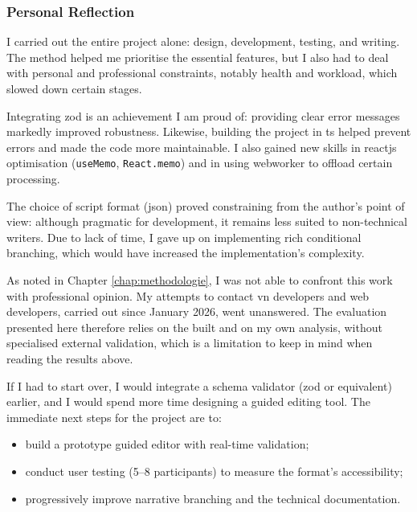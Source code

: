 \subsubsection{Personal Reflection}

I carried out the entire project alone: design, development, testing, and writing. The  method helped me prioritise the essential features, but I also had to deal with personal and professional constraints, notably health and workload, which slowed down certain stages.

Integrating \gls{zod} is an achievement I am proud of: providing clear error messages markedly improved robustness. Likewise, building the project in \gls{ts} helped prevent errors and made the code more maintainable. I also gained new skills in \gls{reactjs} optimisation (\texttt{useMemo}, \texttt{React.memo}) and in using \gls{webworker} to offload certain processing.

The choice of script format (\gls{json}) proved constraining from the author's point of view: although pragmatic for development, it remains less suited to non-technical writers. Due to lack of time, I gave up on implementing rich conditional branching, which would have increased the implementation's complexity.

\clearpage

As noted in Chapter \ref{chap:methodologie}, I was not able to confront this work with professional opinion. My attempts to contact \gls{vn} developers and web developers, carried out since January 2026, went unanswered. The evaluation presented here therefore relies on the  built and on my own analysis, without specialised external validation, which is a limitation to keep in mind when reading the results above.

If I had to start over, I would integrate a schema validator (\gls{zod} or equivalent) earlier, and I would spend more time designing a guided editing tool. The immediate next steps for the project are to:

\begin{itemize}
    \item build a prototype guided editor with real-time validation;
    \item conduct user testing (5–8 participants) to measure the format's accessibility;
    \item progressively improve narrative branching and the technical documentation.
\end{itemize}

